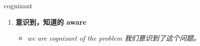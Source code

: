 
\begin{frame}
{\huge cognizant}
\begin{center}
\begin{enumerate}\Large
  \item \textbf{意识到，知道的 aware}
  \begin{itemize}
    \item \em{\Large{we are cognizant of the problem 我们意识到了这个问题。}}
  \end{itemize}
\end{enumerate}
\end{center}
\end{frame}
